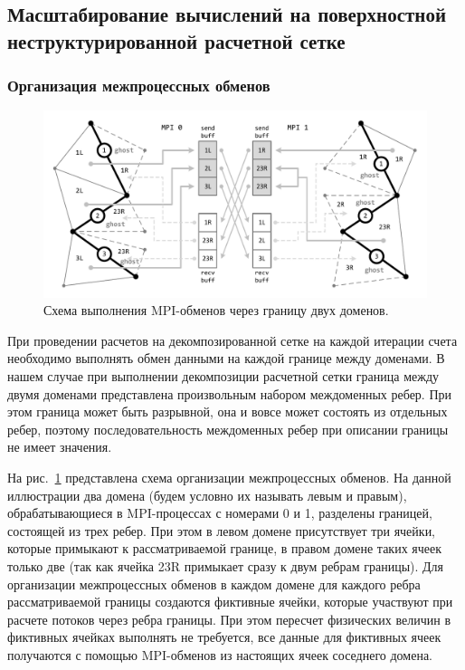 \subsection{Масштабирование вычислений на поверхностной неструктурированной расчетной сетке}

\subsubsection{Организация межпроцессных обменов}

\begin{figure}[ht]
\centering
\includegraphics[width=1.0\textwidth]{pics/text_2_scaling/mpi.pdf}
\caption{Схема выполнения MPI-обменов через границу двух доменов.}\label{fig:text_2_scaling_mpi}
\end{figure}

При проведении расчетов на декомпозированной сетке на каждой итерации счета необходимо выполнять обмен данными на каждой границе между доменами.
В нашем случае при выполнении декомпозиции расчетной сетки граница между двумя доменами представлена произвольным набором междоменных ребер.
При этом граница может быть разрывной, она и вовсе может состоять из отдельных ребер, поэтому последовательность междоменных ребер при описании границы не имеет значения.

На рис.~\ref{fig:text_2_scaling_mpi} представлена схема организации межпроцессных обменов.
На данной иллюстрации два домена (будем условно их называть левым и правым), обрабатывающиеся в MPI-процессах с номерами 0 и 1, разделены границей, состоящей из трех ребер.
При этом в левом домене присутствует три ячейки, которые примыкают к рассматриваемой границе, в правом домене таких ячеек только две (так как ячейка 23R примыкает сразу к двум ребрам границы).
Для организации межпроцессных обменов в каждом домене для каждого ребра рассматриваемой границы создаются фиктивные ячейки, которые участвуют при расчете потоков через ребра границы.
При этом пересчет физических величин в фиктивных ячейках выполнять не требуется, все данные для фиктивных ячеек получаются с помощью MPI-обменов из настоящих ячеек соседнего домена.

